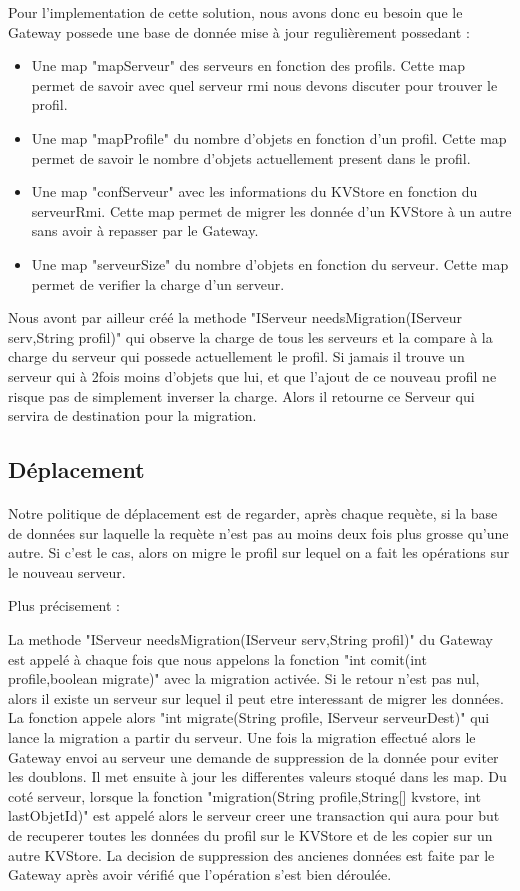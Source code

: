 Pour l'implementation de cette solution, nous avons donc eu besoin que le Gateway possede une base de donnée mise à jour regulièrement possedant :
\begin{itemize}
\item Une map "mapServeur" des serveurs en fonction des profils. Cette map permet de savoir avec quel serveur rmi nous devons discuter pour trouver le profil.
\item Une map "mapProfile" du nombre d'objets en fonction d'un profil. Cette map permet de savoir le nombre d'objets actuellement present dans le profil.
\item Une map "confServeur" avec les informations du KVStore en fonction du serveurRmi. Cette map permet de migrer les donnée d'un KVStore à un autre sans avoir à repasser par le Gateway.
\item Une map "serveurSize" du nombre d'objets en fonction du serveur. Cette map permet de verifier la charge d'un serveur.
\end{itemize}

Nous avont par ailleur créé la methode "IServeur needsMigration(IServeur serv,String profil)" qui observe la charge de tous les serveurs et la compare à la charge du serveur qui possede actuellement le profil.
Si jamais il trouve un serveur qui à 2fois moins d'objets que lui, et que l'ajout de ce nouveau profil ne risque pas de simplement inverser la charge. Alors il retourne ce Serveur qui servira de destination pour la migration.

\subsection{Déplacement}

\paragraph{}
Notre politique de déplacement est de regarder, après chaque requète, si la base de données sur laquelle la requète n'est pas au moins deux fois plus grosse qu'une autre. Si c'est le cas, alors on migre le profil sur lequel on a fait les opérations sur le nouveau serveur.

Plus précisement :

La methode "IServeur needsMigration(IServeur serv,String profil)" du Gateway est appelé à chaque fois que nous appelons la fonction "int comit(int profile,boolean migrate)" avec la migration activée. Si le retour n'est pas nul, alors il existe un serveur sur lequel il peut etre interessant de migrer les données. La fonction appele alors "int migrate(String profile, IServeur serveurDest)" qui lance la migration a partir du serveur.
Une fois la migration effectué alors le Gateway envoi au serveur une demande de suppression de la donnée pour eviter les doublons. Il met ensuite à jour les differentes valeurs stoqué dans les map.
Du coté serveur, lorsque la fonction "migration(String profile,String[] kvstore, int lastObjetId)" est appelé alors le serveur creer une transaction qui aura pour but de recuperer toutes les données du profil sur le KVStore et de les copier sur un autre KVStore. La decision de suppression des ancienes données est faite par le Gateway après avoir vérifié que l'opération s'est bien déroulée.

